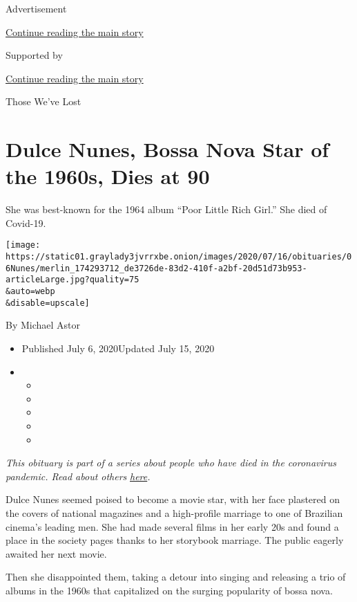 Advertisement

\protect\hyperlink{after-top}{Continue reading the main story}

Supported by

\protect\hyperlink{after-sponsor}{Continue reading the main story}

Those We've Lost

\hypertarget{dulce-nunes-bossa-nova-star-of-the-1960s-dies-at-90}{%
\section{Dulce Nunes, Bossa Nova Star of the 1960s, Dies at
90}\label{dulce-nunes-bossa-nova-star-of-the-1960s-dies-at-90}}

She was best-known for the 1964 album ``Poor Little Rich Girl.'' She
died of Covid-19.

\texttt{[image: https://static01.graylady3jvrrxbe.onion/images/2020/07/16/obituaries/06Nunes/merlin\_174293712\_de3726de-83d2-410f-a2bf-20d51d73b953-articleLarge.jpg?quality=75\\\&auto=webp\\\&disable=upscale]}

By Michael Astor

\begin{itemize}
\item
  Published July 6, 2020Updated July 15, 2020
\item
  \begin{itemize}
  \item
  \item
  \item
  \item
  \item
  \end{itemize}
\end{itemize}

\emph{This obituary is part of a series about people who have died in
the coronavirus pandemic. Read about others}
\href{https://www.nytimes3xbfgragh.onion/interactive/2020/obituaries/people-died-coronavirus-obituaries.html}{\emph{here}}\emph{.}

Dulce Nunes seemed poised to become a movie star, with her face
plastered on the covers of national magazines and a high-profile
marriage to one of Brazilian cinema's leading men. She had made several
films in her early 20s and found a place in the society pages thanks to
her storybook marriage. The public eagerly awaited her next movie.

Then she disappointed them, taking a detour into singing and releasing a
trio of albums in the 1960s that capitalized on the surging popularity
of bossa nova.

